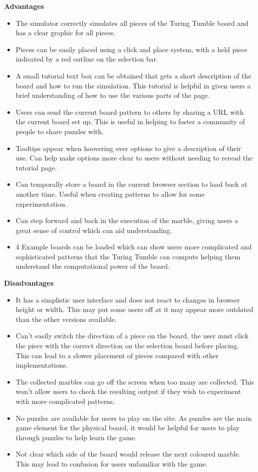 \documentclass{l4proj}
\begin{document}
\textbf{Advantages}
\begin{itemize}
    \item The simulator correctly simulates all pieces of the Turing Tumble board and has a clear graphic for all pieces.
    \item Pieces can be easily placed using a click and place system, with a held piece indicated by a red outline on the selection bar.
    \item A small tutorial text box can be obtained that gets a short description of the board and how to run the simulation. This tutorial is helpful in given users a brief understanding of how to use the various parts of the page.
    \item Users can send the current board pattern to others by sharing a URL with the current board set up. This is useful in helping to foster a community of people to share puzzles with.
    \item Tooltips appear when hoovering over options to give a description of their use. Can help make options more clear to users without needing to reread the tutorial page.
    \item Can temporally store a board in the current browser section to load back at another time. Useful when creating patterns to allow for some experimentation.
    \item Can step forward and back in the execution of the marble, giving users a great sense of control which can aid understanding.
    \item 4 Example boards can be loaded which can show users more complicated and sophisticated patterns that the Turing Tumble can compute helping them understand the computational power of the board.
\end{itemize}

\textbf{Disadvantages}
\begin{itemize}
    \item It has a simplistic user interface and does not react to changes in browser height or width. This may put some users off at it may appear more outdated than the other versions available.
    \item Can't easily switch the direction of a piece on the board, the user must click the piece with the correct direction on the selection board before placing. This can lead to a slower placement of pieces compared with other implementations.
    \item The collected marbles can go off the screen when too many are collected. This won't allow users to check the resulting output if they wish to experiment with more complicated patterns.
    \item No puzzles are available for users to play on the site. As puzzles are the main game element for the physical board, it would be helpful for users to play through puzzles to help learn the game.
    \item Not clear which side of the board would release the next coloured marble. This may lead to confusion for users unfamiliar with the game.
\end{itemize}
\end{document}
